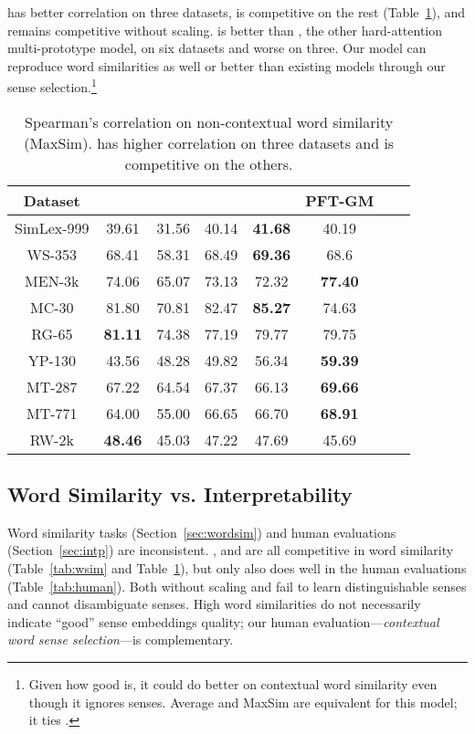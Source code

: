\gasi{-$\beta$} has better correlation on three datasets, is
competitive on the rest (Table~\ref{tab:wsim2}), and remains
competitive without scaling.
\gasi{} is better than , the
other hard-attention multi-prototype model, on six datasets and worse
on three. Our model can reproduce word similarities as well or better
than existing models through our sense selection.\footnote{Given how good  is, it could do better on contextual word similarity even though it ignores senses.  Average and MaxSim are equivalent for this model; it ties \gasi{-$\beta$}.}


\begin{table}[t]
  \small
	\centering
	\begin{tabular}{cccccccc}
		\toprule
		Dataset & \abr{muse} &\sasi &\gasi & \gasi{-$\beta$} & PFT-GM \\
		\midrule
		\midrule
		SimLex-999 & 39.61&31.56&40.14&\textbf{41.68}&40.19 \\
		WS-353& 68.41&58.31&68.49 &\textbf{69.36}&68.6 \\
		MEN-3k& 74.06 &65.07&73.13&72.32&\textbf{77.40} \\
		MC-30& 81.80&70.81&82.47 &\textbf{85.27}&74.63 \\
		RG-65& \textbf{81.11}&74.38&77.19&79.77&79.75 \\
		YP-130& 43.56&48.28&49.82&56.34&\textbf{59.39} \\
		MT-287& 67.22&64.54&67.37&66.13&\textbf{69.66} \\
		MT-771& 64.00&55.00&66.65&66.70&\textbf{68.91} \\
		RW-2k& \textbf{48.46}&45.03&47.22&47.69&45.69 \\
		\bottomrule
	\end{tabular}
     
	\caption{Spearman's correlation on non-contextual word
          similarity (MaxSim). \gasi{-$\beta$} has higher correlation
          on three datasets and is competitive on the
          others. }
	\label{tab:wsim2} 
	
\end{table}


\subsection{Word Similarity vs. Interpretability}

Word similarity tasks (Section~\ref{sec:wordsim}) and human
evaluations (Section~\ref{sec:intp}) are inconsistent.
\gasi{}, \gasi{-$\beta$} and  are
all competitive in word similarity (Table~\ref{tab:wsim} and
Table~\ref{tab:wsim2}), but only \gasi{-$\beta$} also does well in the
human evaluations (Table~\ref{tab:human}). Both \gasi{} without
scaling and  fail to learn distinguishable senses and cannot
disambiguate senses.
High word similarities do not necessarily indicate ``good'' sense
embeddings quality; our human evaluation---\emph{contextual word sense
  selection}---is complementary.


